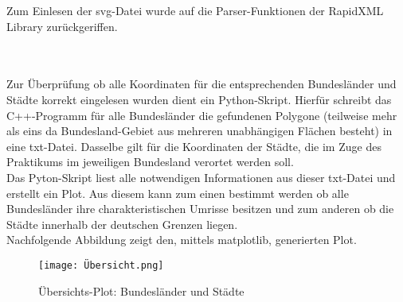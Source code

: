 \documentclass[12pt]{scrartcl}
\begin{document}
Zum Einlesen der svg-Datei wurde auf die Parser-Funktionen der RapidXML Library zurückgeriffen.

\ \\~\\

Zur Überprüfung ob alle Koordinaten für die entsprechenden Bundesländer und Städte korrekt eingelesen wurden dient ein Python-Skript.
Hierfür schreibt das C++-Programm für alle Bundesländer die gefundenen Polygone (teilweise mehr als eins da Bundesland-Gebiet aus mehreren unabhängigen Flächen besteht) in eine txt-Datei.
Dasselbe gilt für die Koordinaten der Städte, die im Zuge des Praktikums im jeweiligen Bundesland verortet werden soll.\\

Das Pyton-Skript liest alle notwendigen Informationen aus dieser txt-Datei und erstellt ein Plot. Aus diesem kann zum einen bestimmt werden ob alle Bundesländer ihre charakteristischen Umrisse besitzen 
und zum anderen ob die Städte innerhalb der deutschen Grenzen liegen.\\
Nachfolgende Abbildung zeigt den, mittels matplotlib, generierten Plot.

\begin{figure}[ht]
    \centering
    \texttt{[image: Übersicht.png]}
    \caption{Übersichts-Plot: Bundesländer und Städte}
\end{figure}
\end{document}
